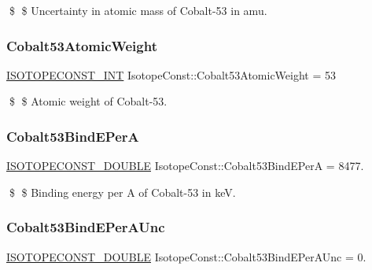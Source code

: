 \$ \$ Uncertainty in atomic mass of Cobalt-\/53 in amu. \mbox{\label{group___isotope_const-_cobalt-_co53_gaa494f6e430e1e08a99d0259d5b1c3525}} 
\subsubsection{\texorpdfstring{Cobalt53\+Atomic\+Weight}{Cobalt53AtomicWeight}}
{\footnotesize\ttfamily \mbox{\hyperlink{group___isotope_const-_macros_ga5f18360b3e99483a35c32d789e62621c}{I\+S\+O\+T\+O\+P\+E\+C\+O\+N\+S\+T\+\_\+\+I\+NT}} Isotope\+Const\+::\+Cobalt53\+Atomic\+Weight = 53}

\$ \$ Atomic weight of Cobalt-\/53. \mbox{\label{group___isotope_const-_cobalt-_co53_ga3812386779b2b7f06afeed07a1ca19b4}} 
\subsubsection{\texorpdfstring{Cobalt53\+Bind\+E\+PerA}{Cobalt53BindEPerA}}
{\footnotesize\ttfamily \mbox{\hyperlink{group___isotope_const-_macros_ga8f45a7272ce02c0b4c65c44636ed719a}{I\+S\+O\+T\+O\+P\+E\+C\+O\+N\+S\+T\+\_\+\+D\+O\+U\+B\+LE}} Isotope\+Const\+::\+Cobalt53\+Bind\+E\+PerA = 8477.}

\$ \$ Binding energy per A of Cobalt-\/53 in keV. \mbox{\label{group___isotope_const-_cobalt-_co53_ga9bb5af45ff6e6b5df24de42589114bc2}} 
\subsubsection{\texorpdfstring{Cobalt53\+Bind\+E\+Per\+A\+Unc}{Cobalt53BindEPerAUnc}}
{\footnotesize\ttfamily \mbox{\hyperlink{group___isotope_const-_macros_ga8f45a7272ce02c0b4c65c44636ed719a}{I\+S\+O\+T\+O\+P\+E\+C\+O\+N\+S\+T\+\_\+\+D\+O\+U\+B\+LE}} Isotope\+Const\+::\+Cobalt53\+Bind\+E\+Per\+A\+Unc = 0.}

